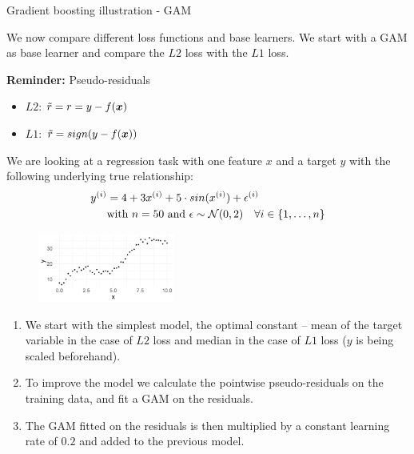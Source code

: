 \begin{vbframe}{Gradient boosting illustration - GAM}

We now compare different loss functions and base learners.
We start with a GAM as base learner and compare the $L2$ loss with
the $L1$ loss.\\
\vspace*{0.1cm}

\textbf{Reminder:} Pseudo-residuals
\begin{itemize}
\item $L2$: $\tilde{r} = r = y - f(\bm{x})$
\item $L1$: $\tilde{r} = sign(y - f(\bm{x}))$
\end{itemize}
We are looking at a regression task with one feature $x$ and a target $y$ with the following
underlying true relationship:
\vspace{-0.2cm}
\begin{align*}
y^{(i)} &=  4 + 3x^{(i)} + 5 \cdot sin(x^{(i)}) + \epsilon^{(i)} \\
&\text{with } n = 50 \text{ and } \epsilon \sim \mathcal{N}(0,2) \quad \forall i 
\in \{1, \ldots, n\}
\end{align*}

\vfill

\begin{figure}
  \includegraphics[width=0.4\textwidth]{figure/illustration_data_normal.png}
\end{figure}

\framebreak


\begin{enumerate}

  \item
    We start with the simplest model, the optimal constant -- mean of the target variable in the case of $L2$ loss and median in the case of $L1$ loss ($y$ is being scaled beforehand).

  \item
    To improve the model we calculate the pointwise pseudo-residuals on the 
    training data, and fit a GAM on the residuals.

  \item
    The GAM fitted on the residuals is then multiplied by a constant learning rate of $0.2$ and added to the previous model.


\end{enumerate}
\end{vbframe}
